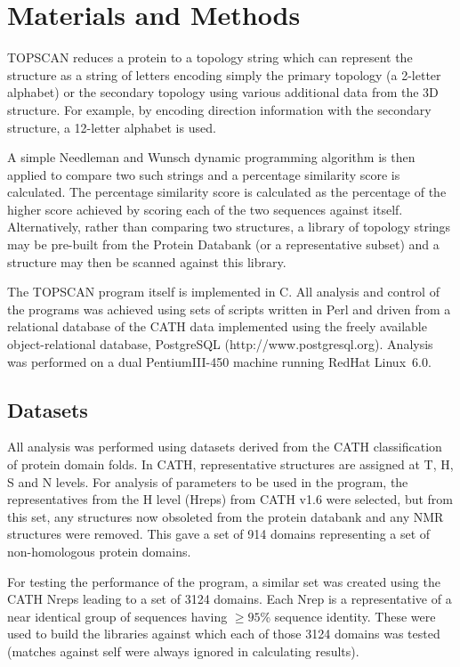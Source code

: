\documentclass{article}
\begin{document}
\section{Materials and Methods}
TOPSCAN reduces a protein to a topology string which can represent the
structure as a string of letters encoding simply the primary topology
(a 2-letter alphabet) or the secondary topology using various
additional data from the 3D structure. For example, by encoding
direction information with the secondary structure, a 12-letter
alphabet is used.

A simple Needleman and Wunsch dynamic programming
algorithm\cite{needleman:wunsch} is then applied to compare two such
strings and a percentage similarity score is calculated.  The
percentage similarity score is calculated as the percentage of the
higher score achieved by scoring each of the two sequences against
itself.  Alternatively, rather than comparing two structures, a
library of topology strings may be pre-built from the Protein Databank
(or a representative subset) and a structure may then be scanned
against this library.

The TOPSCAN program itself is implemented in C. All analysis and
control of the programs was achieved using sets of scripts written in
Perl and driven from a relational database of the CATH data
implemented using the freely available object-relational database,
PostgreSQL (http://www.postgresql.org). Analysis was performed on a
dual PentiumIII-450 machine running RedHat Linux~6.0.

\subsection{Datasets}
All analysis was performed using datasets derived from the CATH
classification of protein domain folds\cite{orengo:cath}. In CATH,
representative structures are assigned at T, H, S and N levels.  For
analysis of parameters to be used in the program, the representatives
from the H level (Hreps) from CATH v1.6 were selected, but from this
set, any structures now obsoleted from the protein
databank\cite{berman:pdb} and any NMR structures were removed. This
gave a set of 914 domains representing a set of non-homologous protein
domains.

For testing the performance of the program, a similar set was created
using the CATH Nreps leading to a set of 3124 domains. Each Nrep is a
representative of a near identical group of sequences having $\ge
95$\% sequence identity. These were used to build the libraries
against which each of those 3124 domains was tested (matches against
self were always ignored in calculating results).
\end{document}
